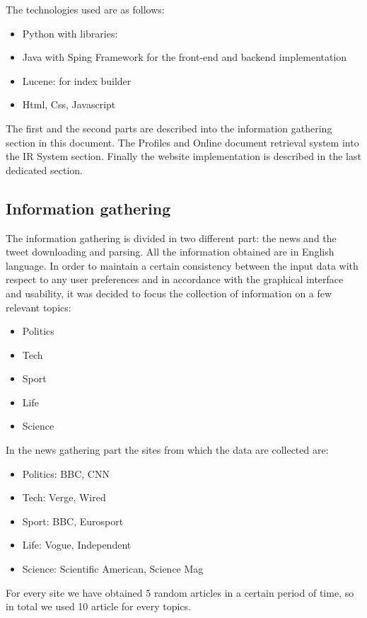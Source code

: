 \documentclass[11pt, english]{article}
\begin{document}
The technologies used are as follows:
\begin{itemize}
\item Python with libraries: 
\item Java with Sping Framework for the front-end and backend implementation
\item Lucene: for index builder
\item Html, Css, Javascript
\end{itemize}

The first and the second parts are described into the information gathering section in this document.
The Profiles and Online document retrieval system into the IR System section.
Finally the website implementation is described in the last dedicated section.

\subsection{Information gathering}

The information gathering is divided in two different part: the news and the tweet downloading and parsing.
All the information obtained are in English language.
In order to maintain a certain consistency between the input data with respect to any user preferences and in accordance with the graphical interface and usability, it was decided to focus the collection of information on a few relevant topics:
\begin{multicols}{3}
\begin{itemize}
\item Politics
\item Tech
\item Sport
\item Life
\item Science
\end{itemize}
\end{multicols}

In the news gathering part the sites from which the data are collected are:
\begin{itemize}
\item Politics: BBC, CNN
\item Tech: Verge, Wired
\item Sport: BBC, Eurosport
\item Life: Vogue, Independent
\item Science: Scientific American, Science Mag
\end{itemize}

For every site we have obtained 5 random articles in a certain period of time, so in total we used 10 article for every topics.
\end{document}
